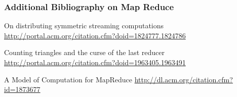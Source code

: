 \documentclass[12pt,aspectratio=169]{beamer}
\begin{document}
\begin{frame}\frametitle{Additional Bibliography on Map Reduce}
\small
On distributing symmetric streaming computations
\url{http://portal.acm.org/citation.cfm?doid=1824777.1824786}

Counting triangles and the curse of the last reducer
\url{http://portal.acm.org/citation.cfm?doid=1963405.1963491}

A Model of Computation for MapReduce \url{http://dl.acm.org/citation.cfm?id=1873677}
\end{frame}
\end{document}
